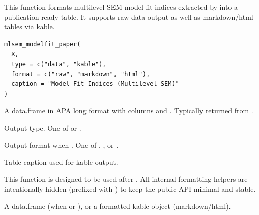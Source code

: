 \documentclass[a4paper]{book}
\begin{document}
%
\begin{Description}
This function formats multilevel SEM model fit indices extracted by
 into a publication-ready table.
It supports raw data output as well as markdown/html tables via kable.
\end{Description}
%
\begin{Usage}
\begin{verbatim}
mlsem_modelfit_paper(
  x,
  type = c("data", "kable"),
  format = c("raw", "markdown", "html"),
  caption = "Model Fit Indices (Multilevel SEM)"
)
\end{verbatim}
\end{Usage}
%
\begin{Arguments}
\begin{ldescription}
\item[\code{x}] A data.frame in APA long format with columns  and .
Typically returned from .

\item[\code{type}] Output type. One of  or .

\item[\code{format}] Output format when .
One of , , or .

\item[\code{caption}] Table caption used for kable output.
\end{ldescription}
\end{Arguments}
%
\begin{Details}
This function is designed to be used after .
All internal formatting helpers are intentionally hidden (prefixed with )
to keep the public API minimal and stable.
\end{Details}
%
\begin{Value}
A data.frame (when  or ),
or a formatted kable object (markdown/html).
\end{Value}
%
\end{document}
